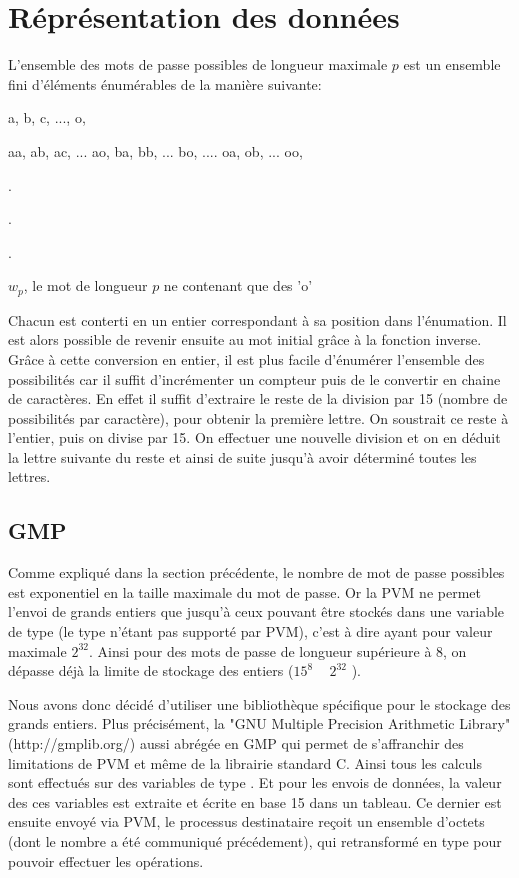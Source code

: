 \documentclass[a4paper,11pt]{article}
\begin{document}
\section{Réprésentation des données}
L'ensemble des mots de passe possibles de longueur maximale $p$ est un ensemble fini d'éléments énumérables  de la manière suivante:
\begin{itemise}
\item a, b, c, ..., o,
\item aa, ab, ac, ... ao, ba, bb, ... bo, .... oa, ob, ... oo,
\item .
\item .
\item .
\item $w_{p}$, le mot de longueur $p$ ne contenant que des 'o'
\end{itemise}
Chacun est conterti en un entier correspondant à sa position dans l'énumation. Il est alors possible de revenir ensuite au mot initial grâce à la fonction inverse. Grâce à cette conversion en entier, il est plus facile d'énumérer l'ensemble des possibilités car il suffit d'incrémenter un compteur puis de le convertir en chaine de caractères. En effet il suffit d'extraire le reste de la division par 15 (nombre de possibilités par caractère), pour obtenir la première lettre. On soustrait ce reste à l'entier, puis on divise par 15. On effectuer une nouvelle division et on en déduit la lettre suivante du reste et ainsi de suite jusqu'à avoir déterminé toutes les lettres.


\subsection{GMP}
Comme expliqué dans la section précédente, le nombre de mot de passe possibles est exponentiel en la taille maximale du mot de passe. Or la PVM ne permet l'envoi de grands entiers que jusqu'à ceux pouvant être stockés dans une variable de type   (le type  n'étant pas supporté par PVM), c'est à dire ayant pour valeur maximale $2^{32}$. Ainsi pour des mots de passe de longueur supérieure à 8, on dépasse déjà la limite de stockage des entiers ($15^{8}$ ~ $2^{32}$ ). 

Nous avons donc décidé d'utiliser une bibliothèque spécifique pour le stockage des grands entiers. Plus précisément, la "GNU Multiple Precision Arithmetic Library" (http://gmplib.org/) aussi abrégée en GMP qui permet de s'affranchir des limitations de PVM et même de la librairie standard C.
Ainsi tous les calculs sont effectués sur des variables de type . Et pour les envois de données, la valeur des ces variables est extraite et écrite en base 15 dans un tableau. Ce dernier est ensuite envoyé via PVM, le processus destinataire reçoit un ensemble d'octets (dont le nombre a été communiqué précédement), qui retransformé en type  pour pouvoir effectuer les opérations.
\end{document}
